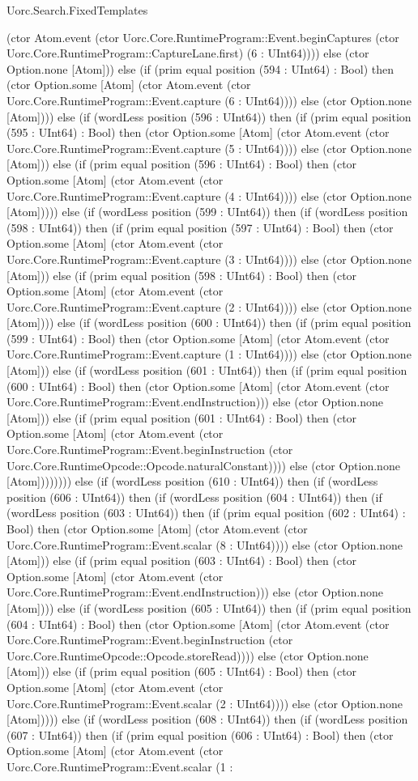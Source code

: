 \begin{lexlean}{Uorc.Search.FixedTemplates}
\begin{semanticmodule}
{(ctor Atom.event (ctor Uorc.Core.RuntimeProgram::Event.beginCaptures (ctor Uorc.Core.RuntimeProgram::CaptureLane.first) (6 : UInt64)))) else (ctor Option.none [Atom])) else (if (prim equal position (594 : UInt64) : Bool) then (ctor Option.some [Atom] (ctor Atom.event (ctor Uorc.Core.RuntimeProgram::Event.capture (6 : UInt64)))) else (ctor Option.none [Atom]))) else (if (wordLess position (596 : UInt64)) then (if (prim equal position (595 : UInt64) : Bool) then (ctor Option.some [Atom] (ctor Atom.event (ctor Uorc.Core.RuntimeProgram::Event.capture (5 : UInt64)))) else (ctor Option.none [Atom])) else (if (prim equal position (596 : UInt64) : Bool) then (ctor Option.some [Atom] (ctor Atom.event (ctor Uorc.Core.RuntimeProgram::Event.capture (4 : UInt64)))) else (ctor Option.none [Atom])))) else (if (wordLess position (599 : UInt64)) then (if (wordLess position (598 : UInt64)) then (if (prim equal position (597 : UInt64) : Bool) then (ctor Option.some [Atom] (ctor Atom.event (ctor Uorc.Core.RuntimeProgram::Event.capture (3 : UInt64)))) else (ctor Option.none [Atom])) else (if (prim equal position (598 : UInt64) : Bool) then (ctor Option.some [Atom] (ctor Atom.event (ctor Uorc.Core.RuntimeProgram::Event.capture (2 : UInt64)))) else (ctor Option.none [Atom]))) else (if (wordLess position (600 : UInt64)) then (if (prim equal position (599 : UInt64) : Bool) then (ctor Option.some [Atom] (ctor Atom.event (ctor Uorc.Core.RuntimeProgram::Event.capture (1 : UInt64)))) else (ctor Option.none [Atom])) else (if (wordLess position (601 : UInt64)) then (if (prim equal position (600 : UInt64) : Bool) then (ctor Option.some [Atom] (ctor Atom.event (ctor Uorc.Core.RuntimeProgram::Event.endInstruction))) else (ctor Option.none [Atom])) else (if (prim equal position (601 : UInt64) : Bool) then (ctor Option.some [Atom] (ctor Atom.event (ctor Uorc.Core.RuntimeProgram::Event.beginInstruction (ctor Uorc.Core.RuntimeOpcode::Opcode.naturalConstant)))) else (ctor Option.none [Atom]))))))) else (if (wordLess position (610 : UInt64)) then (if (wordLess position (606 : UInt64)) then (if (wordLess position (604 : UInt64)) then (if (wordLess position (603 : UInt64)) then (if (prim equal position (602 : UInt64) : Bool) then (ctor Option.some [Atom] (ctor Atom.event (ctor Uorc.Core.RuntimeProgram::Event.scalar (8 : UInt64)))) else (ctor Option.none [Atom])) else (if (prim equal position (603 : UInt64) : Bool) then (ctor Option.some [Atom] (ctor Atom.event (ctor Uorc.Core.RuntimeProgram::Event.endInstruction))) else (ctor Option.none [Atom]))) else (if (wordLess position (605 : UInt64)) then (if (prim equal position (604 : UInt64) : Bool) then (ctor Option.some [Atom] (ctor Atom.event (ctor Uorc.Core.RuntimeProgram::Event.beginInstruction (ctor Uorc.Core.RuntimeOpcode::Opcode.storeRead)))) else (ctor Option.none [Atom])) else (if (prim equal position (605 : UInt64) : Bool) then (ctor Option.some [Atom] (ctor Atom.event (ctor Uorc.Core.RuntimeProgram::Event.scalar (2 : UInt64)))) else (ctor Option.none [Atom])))) else (if (wordLess position (608 : UInt64)) then (if (wordLess position (607 : UInt64)) then (if (prim equal position (606 : UInt64) : Bool) then (ctor Option.some [Atom] (ctor Atom.event (ctor Uorc.Core.RuntimeProgram::Event.scalar (1 : }
\end{semanticmodule}
\end{lexlean}
